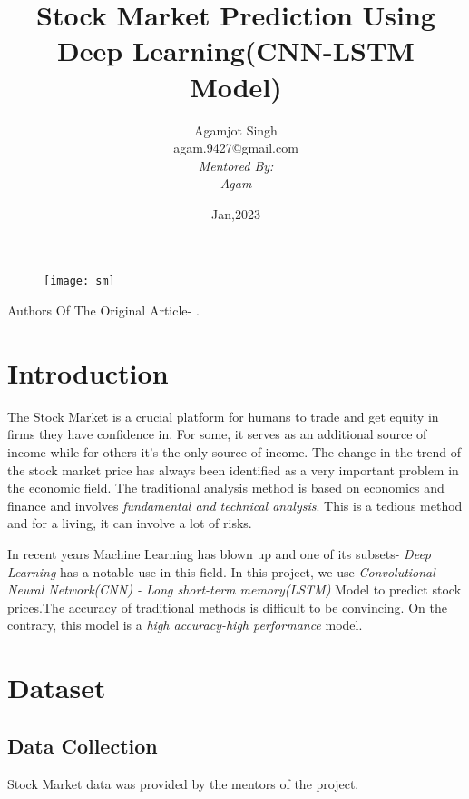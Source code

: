 \documentclass[12pt]{article}
\title{\textbf{Stock Market Prediction Using Deep Learning(CNN-LSTM Model)}}
\author{Agamjot Singh\\agam.9427@gmail.com\\\textit{Mentored By:}\\ \textit{Agam}}
\date{Jan,2023}
\begin{document}
\maketitle
\begin{figure}[h]

\centering



\texttt{[image: sm]}


\end{figure}



 
Authors Of The Original Article- \cite{lu2020cnn}. 




\clearpage

\tableofcontents

\clearpage

\section{Introduction}
The Stock Market is a crucial platform for humans to trade and get equity in firms they have confidence in. For some, it serves as an additional source of income while for others it's the only source of income. The change in the trend of the stock market price has always been identified as a very important problem in the economic field. The traditional analysis method is based on economics and finance and involves \textit{fundamental and technical analysis}.
This is a tedious method and for a living, it can involve a lot of risks.


In recent years Machine Learning has blown up and one of its subsets- \textit{Deep Learning} has a notable use in this field. In this project, we use \textit{Convolutional Neural Network(CNN) - Long short-term memory(LSTM)} Model to predict stock prices.The accuracy of traditional methods is difficult to be convincing. On the contrary, this model is a \textit{high accuracy-high performance} model.

\section{Dataset}
\subsection{Data Collection}
Stock Market data was provided by the mentors of the project.
\end{document}
